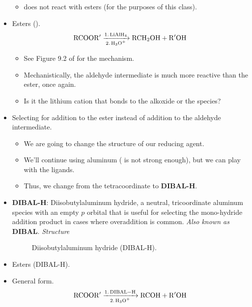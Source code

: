 \documentclass[../notes.tex]{subfiles}
\begin{document}
\begin{itemize}
    \begin{itemize}
        \item {} does not react with esters (for the purposes of this class).
    \end{itemize}
    \item Esters ().
    \begin{equation*}
        \ce{RCOOR$'$ ->[1. LiAlH4][2. H3O+] RCH2OH + R$'$OH}
    \end{equation*}
    \begin{itemize}
        \item See Figure 9.2 of \textcite{bib:CHEM22100Notes} for the mechanism.
        \item Mechanistically, the aldehyde intermediate is much more reactive than the ester, once again.
        \item Is it the lithium cation that bonds to the alkoxide or the  species?
    \end{itemize}
    \item Selecting for addition to the ester instead of addition to the aldehyde intermediate.
    \begin{itemize}
        \item We are going to change the structure of our reducing agent.
        \item We'll continue using aluminum ( is not strong enough), but we can play with the ligands.
        \item Thus, we change from the tetracoordinate  to \textbf{DIBAL-H}.
    \end{itemize}
    \item \textbf{DIBAL-H}: Diisobutylaluminum hydride, a neutral, tricoordinate aluminum species with an empty $p$ orbital that is useful for selecting the mono-hydride addition product in cases where overaddition is common. \emph{Also known as} \textbf{DIBAL}. \emph{Structure}
    \begin{figure}[h!]
        \centering
        \footnotesize
        \caption{Diisobutylaluminum hydride (DIBAL-H).}
        \label{fig:DIBAL}
    \end{figure}
    \item Esters (DIBAL-H).
    \item General form.
    \begin{equation*}
        \ce{RCOOR$'$ ->[1. DIBAL-H][2. H3O+] RCOH + R$'$OH}
    \end{equation*}

\end{itemize}
\end{document}
